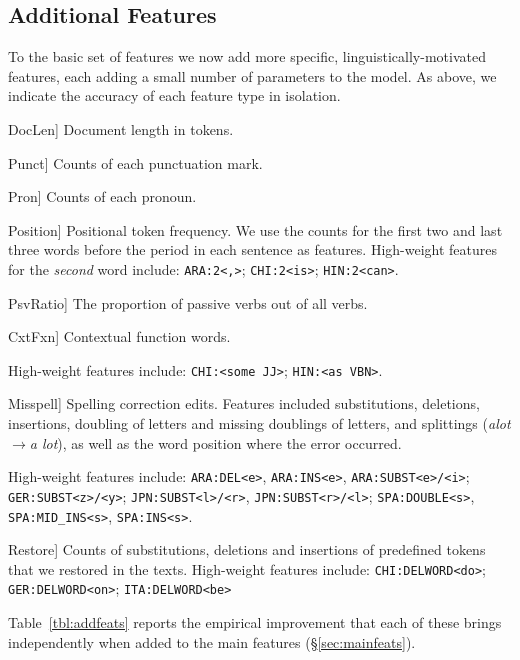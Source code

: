 \documentclass[11pt,letterpaper]{article}
\newcommand{\Sref}[1]{\S\ref{#1}}
\newcommand{\Tref}[1]{Table~\ref{#1}}
\newcommand{\feat}[1]{\textsmaller[.5]{\textsf{#1}}} %
\newcommand{\textnl}{\textsl}
\begin{document}
\subsection{Additional Features}\label{sec:addfeats}
To the basic set of features we now add more specific,
linguistically-motivated features, each adding a small number of
parameters to the model.  As above, we indicate the accuracy of each
feature type in isolation.

\begin{compactdesc}
\item[\feat{DocLen}] Document length in tokens.
\item[\feat{Punct}] Counts of each punctuation mark. 
\item[\feat{Pron}] Counts of each pronoun.
\item[\feat{Position}] Positional token frequency. We use the counts
  for the first two and last three words before the period in each
  sentence as features. High-weight features for the \emph{second} word include: {\tt ARA:2<,>}; {\tt CHI:2<is>}; {\tt HIN:2<can>}.
\item[\feat{PsvRatio}] The proportion of passive verbs out of all
  verbs.
\item[\feat{CxtFxn}] Contextual function words. \raggedright High-weight features include: {\tt CHI:<some JJ>}; \mbox{\tt HIN:<as VBN>}. 
\item[\feat{Misspell}] Spelling correction edits. Features included substitutions, deletions, insertions, doubling of letters and missing doublings of letters, and splittings (\textnl{alot}$\rightarrow$\textnl{a lot}), as well as the word position where the error occurred. \raggedright High-weight features include: {\tt ARA:DEL<e>}, {\tt ARA:INS<e>}, {\tt ARA:SUBST<e>/<i>}; {\tt GER:SUBST<z>/<y>}; {\tt JPN:SUBST<l>/<r>}, {\tt JPN:SUBST<r>/<l>}; {\tt SPA:DOUBLE<s>}, {\tt SPA:MID\_INS<s>}, {\tt SPA:INS<s>}.
\item[\feat{Restore}] Counts of substitutions, deletions and
  insertions of predefined tokens that we restored in the texts. High-weight features include: {\tt CHI:DELWORD<do>}; {\tt GER:DELWORD<on>}; {\tt ITA:DELWORD<be>}  
\end{compactdesc}
\noindent
\Tref{tbl:addfeats} reports the empirical improvement that each of
these brings independently when added to the main features
(\Sref{sec:mainfeats}).
\end{document}
